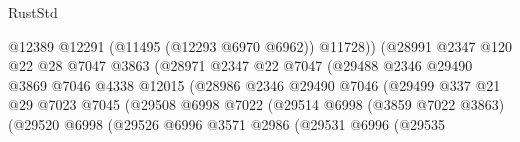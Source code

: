 \begin{lexlean}{RustStd}
\begin{coremodule}
                                            @12389
                                            @12291
                                            (@11495 (@12293 @6970 @6962))
                                            @11728))
                                        (@28991
                                          @2347
                                          @120
                                          @22
                                          @28
                                          @7047
                                          @3863
                                          (@28971
                                            @2347
                                            @22
                                            @7047
                                            (@29488
                                              @2346
                                              @29490
                                              @3869
                                              @7046
                                              @4338
                                              @12015
                                              (@28986
                                                @2346
                                                @29490
                                                @7046
                                                (@29499
                                                  @337
                                                  @21
                                                  @29
                                                  @7023
                                                  @7045
                                                  (@29508
                                                    @6998
                                                    @7022
                                                    (@29514
                                                      @6998
                                                      (@3859 @7022 @3863)
                                                      (@29520
                                                        @6998
                                                        (@29526
                                                          @6996
                                                          @3571
                                                          @2986
                                                          (@29531
                                                            @6996
                                                            (@29535

\end{coremodule}
\end{lexlean}
